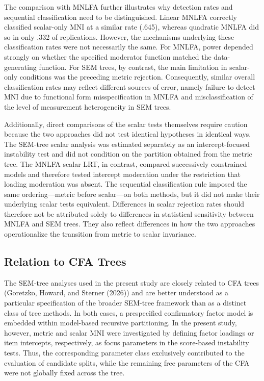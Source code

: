 \documentclass[
  man,
  floatsintext]{apa7}
\begin{document}
The comparison with MNLFA further illustrates why detection rates and
sequential classification need to be distinguished. Linear MNLFA
correctly classified scalar-only MNI at a similar rate (.645), whereas
quadratic MNLFA did so in only .332 of replications. However, the
mechanisms underlying these classification rates were not necessarily
the same. For MNLFA, power depended strongly on whether the specified
moderator function matched the data-generating function. For SEM trees,
by contrast, the main limitation in scalar-only conditions was the
preceding metric rejection. Consequently, similar overall classification
rates may reflect different sources of error, namely failure to detect
MNI due to functional form misspecification in MNLFA and
misclassification of the level of measurement heterogeneity in SEM
trees.

Additionally, direct comparisons of the scalar tests themselves require
caution because the two approaches did not test identical hypotheses in
identical ways. The SEM-tree scalar analysis was estimated separately as
an intercept-focused instability test and did not condition on the
partition obtained from the metric tree. The MNLFA scalar LRT, in
contrast, compared successively constrained models and therefore tested
intercept moderation under the restriction that loading moderation was
absent. The sequential classification rule imposed the same
ordering---metric before scalar---on both methods, but it did not make
their underlying scalar tests equivalent. Differences in scalar
rejection rates should therefore not be attributed solely to differences
in statistical sensitivity between MNLFA and SEM trees. They also
reflect differences in how the two approaches operationalize the
transition from metric to scalar invariance.

\subsection{Relation to CFA Trees}\label{relation-to-cfa-trees}

The SEM-tree analyses used in the present study are closely related to
CFA trees (Goretzko, Howard, and Sterner (2026)) and are better
understood as a particular specification of the broader SEM-tree
framework than as a distinct class of tree methods. In both cases, a
prespecified confirmatory factor model is embedded within model-based
recursive partitioning. In the present study, however, metric and scalar
MNI were investigated by defining factor loadings or item intercepts,
respectively, as focus parameters in the score-based instability tests.
Thus, the corresponding parameter class exclusively contributed to the
evaluation of candidate splits, while the remaining free parameters of
the CFA were not globally fixed across the tree.
\end{document}
